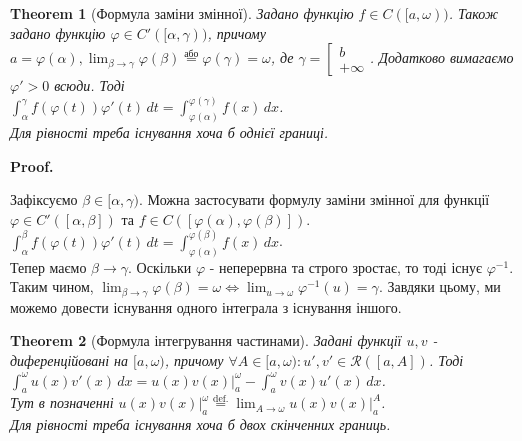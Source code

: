 \documentclass[a4paper, 10pt]{article}
\makeatletter
\def\huge{\displaystyle}
\def\qed{$\blacksquare$}
\theoremstyle{theoremdd}
\newtheorem{theorem}{Theorem}[subsection]
\theoremstyle{theoremdd}
\theoremstyle{theoremdd}
\theoremstyle{theoremdd}
\theoremstyle{theoremdd}
\theoremstyle{theoremdd}
\theoremstyle{theoremdd}
\theoremstyle{theoremdd}
\theoremstyle{theoremdd}
\renewenvironment{proof}[1][Proof.\\]{\par
\pushQED{\hfill \qed}%
\normalfont \topsep6\p@\@plus6\p@\relax
\trivlist
\item\relax
{\bfseries
#1\@addpunct{.}}\hspace\labelsep\ignorespaces
}{%
\popQED\endtrivlist\@endpefalse
}
\makeatother
\begin{document}

\begin{theorem}[Формула заміни змінної]
Задано функцію $f \in C([a,\omega))$. Також задано функцію $\varphi \in C'([\alpha,\gamma))$, причому $a = \varphi(\alpha), \huge\lim_{\beta \to \gamma} \varphi(\beta) \overset{\text{або}}{=} \varphi(\gamma) = \omega$, де $\gamma = \left[\begin{gathered} b \\ +\infty \end{gathered} \right.$. Додатково вимагаємо $\varphi' > 0$ всюди. Тоді\\
$\huge\int_\alpha^\gamma f(\varphi(t))\varphi'(t)\,dt = \int_{\varphi(\alpha)}^{\varphi(\gamma)} f(x)\,dx$.\\
Для рівності треба існування хоча б однієї границі.
\end{theorem}

\begin{proof}
Зафіксуємо $\beta \in [\alpha,\gamma)$. Можна застосувати формулу заміни змінної для функції $\varphi \in C'([\alpha,\beta])$ та $f \in C([\varphi(\alpha), \varphi(\beta)])$.\\
$\huge\int_\alpha^\beta f(\varphi(t))\varphi'(t)\,dt = \int_{\varphi(\alpha)}^{\varphi(\beta)} f(x)\,dx$.\\
Тепер маємо $\beta \to \gamma$. Оскільки $\varphi$ - неперервна та строго зростає, то тоді існує $\varphi^{-1}$. Таким чином, $\displaystyle\lim_{\beta \to \gamma} \varphi(\beta) = \omega \iff \lim_{u \to \omega} \varphi^{-1}(u) = \gamma$. Завдяки цьому, ми можемо довести існування одного інтеграла з існування іншого.
\end{proof}

\begin{theorem}[Формула інтегрування частинами]
Задані функції $u,v$ - диференційовані на $[a,\omega)$, причому $\forall A \in [a,\omega): u',v' \in \mathcal{R}([a,A])$. Тоді\\
$\displaystyle\int_a^\omega u(x)v'(x)\,dx = u(x)v(x) \Big|_a^{\omega} - \int_a^\omega v(x)u'(x)\,dx$.\\
Тут в позначенні $u(x)v(x) \Big|_a^\omega \overset{\text{def.}}{=} \displaystyle\lim_{A \to \omega} u(x)v(x) \Big|_{a}^A$.\\
Для рівності треба існування хоча б двох скінченних границь.
\end{theorem}
\end{document}
